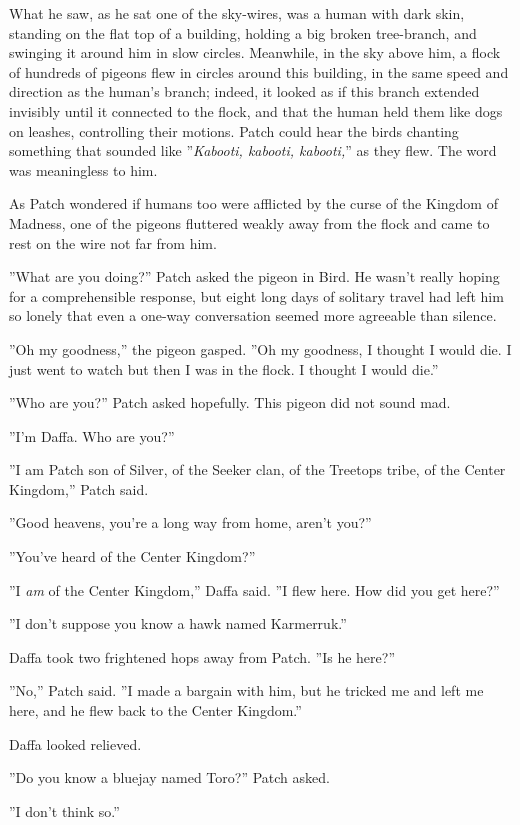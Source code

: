 \documentclass[12pt]{book}
\begin{document}
What he saw, as he sat one of the sky-wires, was a human with dark
skin, standing on the flat top of a building, holding a big broken
tree-branch, and swinging it around him in slow circles. Meanwhile, in
the sky above him, a flock of hundreds of pigeons flew in circles
around this building, in the same speed and direction as the human's
branch; indeed, it looked as if this branch extended invisibly until
it connected to the flock, and that the human held them like dogs on
leashes, controlling their motions. Patch could hear the birds
chanting something that sounded like ''\textit{Kabooti, kabooti,
kabooti,}'' as they flew. The word was meaningless to him.

As Patch wondered if humans too were afflicted by the curse of the
Kingdom of Madness, one of the pigeons fluttered weakly away from the
flock and came to rest on the wire not far from him.

''What are you doing?'' Patch asked the pigeon in Bird. He wasn't
really hoping for a comprehensible response, but eight long days of
solitary travel had left him so lonely that even a one-way
conversation seemed more agreeable than silence.

''Oh my goodness,'' the pigeon gasped. ''Oh my goodness, I thought I
would die. I just went to watch but then I was in the flock. I thought
I would die.''

''Who are you?'' Patch asked hopefully. This pigeon did not sound mad.

''I'm Daffa. Who are you?''

''I am Patch son of Silver, of the Seeker clan, of the Treetops tribe,
of the Center Kingdom,'' Patch said.

''Good heavens, you're a long way from home, aren't you?''

''You've heard of the Center Kingdom?''

''I \textit{am} of the Center Kingdom,'' Daffa said. ''I flew
here. How did you get here?''

''I don't suppose you know a hawk named Karmerruk.''

Daffa took two frightened hops away from Patch. ''Is he here?''

''No,'' Patch said. ''I made a bargain with him, but he tricked me and
left me here, and he flew back to the Center Kingdom.''

Daffa looked relieved.

''Do you know a bluejay named Toro?'' Patch asked.

''I don't think so.''
\end{document}
